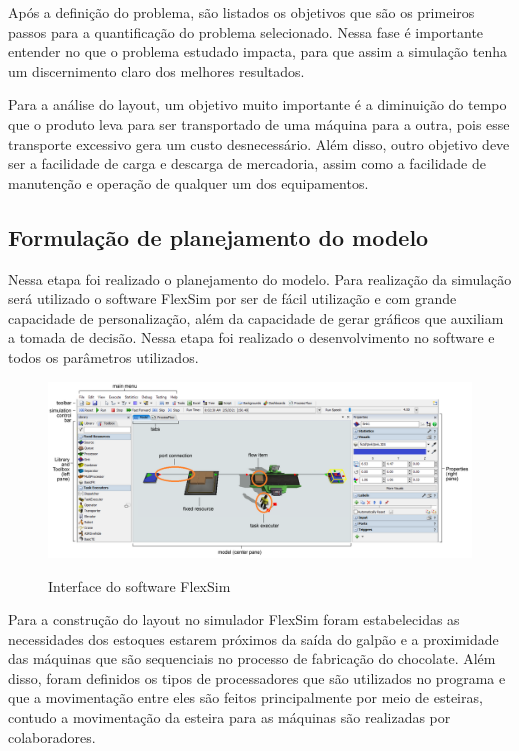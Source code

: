 \documentclass[
	12pt,				%
	openright,			%
	oneside,			%
	a4paper,			%
	english,			%
	french,				%
	spanish,			%
	brazil				%
	]{abntex2}
\begin{document}
Após a definição do problema, são listados os objetivos que são os primeiros passos para a quantificação do problema selecionado. Nessa fase é importante entender no que o problema estudado impacta, para que assim a simulação tenha um discernimento claro dos melhores resultados. 

Para a análise do layout, um objetivo muito importante é a diminuição do tempo que o produto leva para ser transportado de uma máquina para a outra, pois esse transporte excessivo gera um custo desnecessário. Além disso, outro objetivo deve ser a facilidade de carga e descarga de mercadoria, assim como a facilidade de manutenção e operação de qualquer um dos equipamentos.

\subsection{Formulação de planejamento do modelo}

Nessa etapa foi realizado o planejamento do modelo. Para realização da simulação será utilizado o software FlexSim por ser de fácil utilização e com grande capacidade de personalização, além da capacidade de gerar gráficos que auxiliam a tomada de decisão. Nessa etapa foi realizado o desenvolvimento no software e todos os parâmetros utilizados.

\begin{figure}[H]
\begin{center}
\caption{Interface do software FlexSim}
\includegraphics[scale=0.4]{../../Pictures/interface.png} 
\label{fluxo}
\end{center}
\end{figure}


Para a construção do layout no simulador FlexSim foram estabelecidas as necessidades dos estoques estarem próximos da saída do galpão e a proximidade das máquinas que são sequenciais no processo de fabricação do chocolate. Além disso, foram definidos os tipos de processadores que são utilizados no programa e que a movimentação entre eles são feitos principalmente por meio de esteiras, contudo a movimentação da esteira para as máquinas são realizadas por colaboradores.
\end{document}
